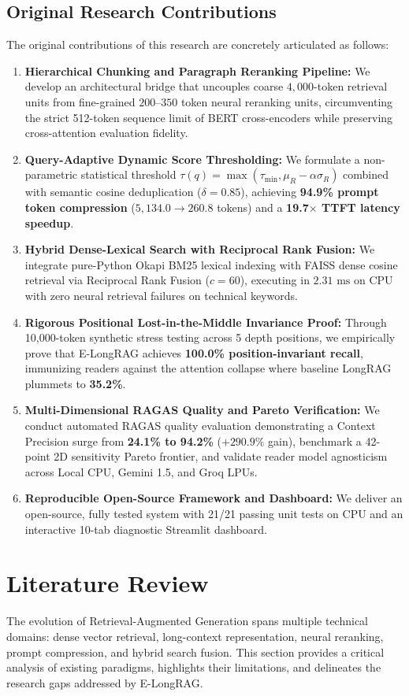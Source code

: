 \documentclass[lettersize,journal]{IEEEtran}
\begin{document}
\subsection{Original Research Contributions}
The original contributions of this research are concretely articulated as follows:
\begin{enumerate}
    \item \textbf{Hierarchical Chunking and Paragraph Reranking Pipeline:} We develop an architectural bridge that uncouples coarse $4,000$-token retrieval units from fine-grained $200$--$350$ token neural reranking units, circumventing the strict 512-token sequence limit of BERT cross-encoders while preserving cross-attention evaluation fidelity.
    \item \textbf{Query-Adaptive Dynamic Score Thresholding:} We formulate a non-parametric statistical threshold $\tau(q) = \max(\tau_{\min}, \mu_R - \alpha \sigma_R)$ combined with semantic cosine deduplication ($\delta = 0.85$), achieving \textbf{94.9\% prompt token compression} ($5,134.0 \rightarrow 260.8$ tokens) and a \textbf{19.7$\times$ TTFT latency speedup}.
    \item \textbf{Hybrid Dense-Lexical Search with Reciprocal Rank Fusion:} We integrate pure-Python Okapi BM25 lexical indexing with FAISS dense cosine retrieval via Reciprocal Rank Fusion ($c=60$), executing in $2.31\text{ ms}$ on CPU with zero neural retrieval failures on technical keywords.
    \item \textbf{Rigorous Positional Lost-in-the-Middle Invariance Proof:} Through 10,000-token synthetic stress testing across 5 depth positions, we empirically prove that E-LongRAG achieves \textbf{100.0\% position-invariant recall}, immunizing readers against the attention collapse where baseline LongRAG plummets to \textbf{35.2\%}.
    \item \textbf{Multi-Dimensional RAGAS Quality and Pareto Verification:} We conduct automated RAGAS quality evaluation demonstrating a Context Precision surge from \textbf{24.1\% to 94.2\%} ($+290.9\%$ gain), benchmark a 42-point 2D sensitivity Pareto frontier, and validate reader model agnosticism across Local CPU, Gemini 1.5, and Groq LPUs.
    \item \textbf{Reproducible Open-Source Framework and Dashboard:} We deliver an open-source, fully tested system with 21/21 passing unit tests on CPU and an interactive 10-tab diagnostic Streamlit dashboard.
\end{enumerate}

\section{Literature Review}
The evolution of Retrieval-Augmented Generation spans multiple technical domains: dense vector retrieval, long-context representation, neural reranking, prompt compression, and hybrid search fusion. This section provides a critical analysis of existing paradigms, highlights their limitations, and delineates the research gaps addressed by E-LongRAG.
\end{document}
